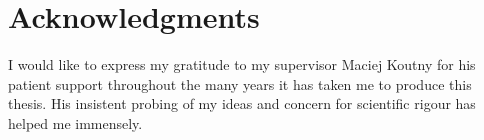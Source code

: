 \section*{Acknowledgments}

I would like to express my gratitude to my supervisor Maciej Koutny for his
patient support throughout the many years it has taken me to produce this 
thesis. His insistent probing of my ideas and concern for scientific rigour
has helped me immensely.  
